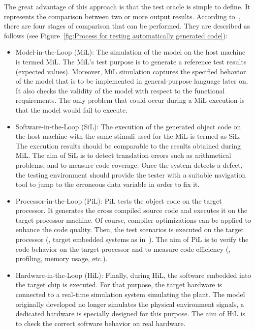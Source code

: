 The great advantage of this approach is that the test oracle is simple to define. It represents the comparison between two or more output results. According to~\cite{shokry2009model,stuermer2007systematic}, there are four stages of comparison that can be performed. They are described as follows (see Figure~\ref{fig:Process for testing automatically generated code}):
 
\begin{itemize}
	\item Model-in-the-Loop (MiL): 
	The simulation of the model on the host machine is termed MiL. 
    The MiL's test purpose is to generate a reference test results (expected values). Moreover, MiL simulation captures the specified behavior of the model that is to be implemented in general-purpose language later on. It also checks the validity of the model with respect to the functional requirements. The only problem that could occur during a MiL execution is that the model would fail to execute.

	\item Software-in-the-Loop (SiL): 
	The execution of the generated object code on the host machine with the same stimuli used for the MiL is termed as SiL. The execution results should be comparable to the results obtained during MiL. 
	The aim of SiL is to detect translation errors such as arithmetical problems, and to measure code coverage.
	Once the system detects a defect, the testing environment should provide the tester with a suitable navigation tool to jump to the erroneous data variable in order to fix it.
	
	\item Processor-in-the-Loop (PiL): 
	PiL tests the object code on the target processor. It generates the cross compiled source code and executes it on the target processor machine. Of course, compiler optimizations can be applied to enhance the code quality. Then, the test scenarios is executed on the target processor (\eg, target embedded systems as in~\cite{shokry2009model}). The aim of PiL is to verify the code behavior on the target processor and to measure code efficiency (\eg, profiling, memory usage, etc.).
	
	\item Hardware-in-the-Loop (HiL): 
	Finally, during HiL, the software embedded into the target chip is executed. For that purpose, the target hardware is connected to a real-time simulation system simulating the plant. The model originally developed no longer simulates the physical environment signals, a dedicated hardware is specially designed for this purpose. The aim of HiL is to check the correct software behavior on real hardware.
\end{itemize}

